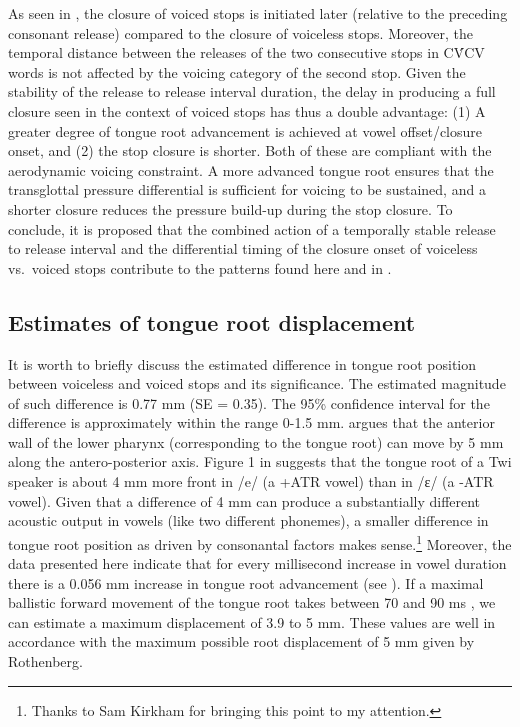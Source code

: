 \documentclass[12pt,]{article}
\let\rmarkdownfootnote\footnote%
\def\footnote{\protect\rmarkdownfootnote}
\begin{document}
As seen in \citet{coretta2018j}, the closure of voiced stops is
initiated later (relative to the preceding consonant release) compared
to the closure of voiceless stops. Moreover, the temporal distance
between the releases of the two consecutive stops in CV́CV words is not
affected by the voicing category of the second stop. Given the stability
of the release to release interval duration, the delay in producing a
full closure seen in the context of voiced stops has thus a double
advantage: (1) A greater degree of tongue root advancement is achieved
at vowel offset/closure onset, and (2) the stop closure is shorter. Both
of these are compliant with the aerodynamic voicing constraint. A more
advanced tongue root ensures that the transglottal pressure differential
is sufficient for voicing to be sustained, and a shorter closure reduces
the pressure build-up during the stop closure. To conclude, it is
proposed that the combined action of a temporally stable release to
release interval and the differential timing of the closure onset of
voiceless vs.~voiced stops contribute to the patterns found here and in
\citet{coretta2018j}.

\hypertarget{estimates-of-tongue-root-displacement}{%
\subsection{Estimates of tongue root
displacement}\label{estimates-of-tongue-root-displacement}}

It is worth to briefly discuss the estimated difference in tongue root
position between voiceless and voiced stops and its significance. The
estimated magnitude of such difference is 0.77 mm (SE = 0.35). The 95\%
confidence interval for the difference is approximately within the range
0-1.5 mm. \citet{rothenberg1967} argues that the anterior wall of the
lower pharynx (corresponding to the tongue root) can move by 5 mm along
the antero-posterior axis. Figure 1 in \citet{kirkham2017} suggests that
the tongue root of a Twi speaker is about 4 mm more front in /e/ (a +ATR
vowel) than in /ɛ/ (a -ATR vowel). Given that a difference of 4 mm can
produce a substantially different acoustic output in vowels (like two
different phonemes), a smaller difference in tongue root position as
driven by consonantal factors makes
sense.\footnote{Thanks to Sam Kirkham for bringing this point to my attention.}
Moreover, the data presented here indicate that for every millisecond
increase in vowel duration there is a 0.056 mm increase in tongue root
advancement (see ). If a maximal ballistic forward
movement of the tongue root takes between 70 and 90 ms
\citep{rothenberg1967}, we can estimate a maximum displacement of 3.9 to
5 mm. These values are well in accordance with the maximum possible root
displacement of 5 mm given by Rothenberg.
\end{document}
